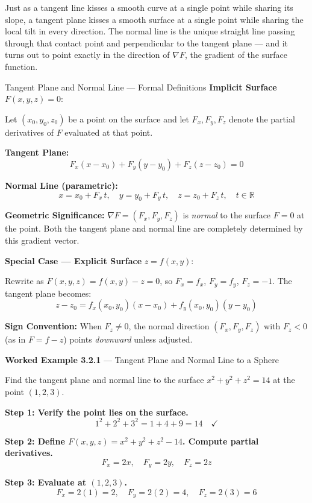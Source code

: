 \documentclass[12pt,a4paper]{article}
\begin{document}
Just as a tangent line kisses a smooth curve at a single point while sharing its slope, a tangent plane kisses a smooth surface at a single point while sharing the local tilt in every direction. The normal line is the unique straight line passing through that contact point and perpendicular to the tangent plane --- and it turns out to point exactly in the direction of $\nabla F$, the gradient of the surface function.

\begin{infobox}{Tangent Plane and Normal Line --- Formal Definitions}
\textbf{Implicit Surface} $F(x,y,z) = 0$:

Let $(x_0, y_0, z_0)$ be a point on the surface and let $F_x, F_y, F_z$ denote the partial derivatives of $F$ evaluated at that point.

\textbf{Tangent Plane:}
\[
  F_x(x - x_0) + F_y(y - y_0) + F_z(z - z_0) = 0
\]

\textbf{Normal Line (parametric):}
\[
  x = x_0 + F_x\, t, \quad y = y_0 + F_y\, t, \quad z = z_0 + F_z\, t, \quad t \in \mathbb{R}
\]

\textbf{Geometric Significance:} $\nabla F = (F_x, F_y, F_z)$ is \emph{normal} to the surface $F = 0$ at the point. Both the tangent plane and normal line are completely determined by this gradient vector.

\textbf{Special Case --- Explicit Surface} $z = f(x,y)$:

Rewrite as $F(x,y,z) = f(x,y) - z = 0$, so $F_x = f_x$, $F_y = f_y$, $F_z = -1$. The tangent plane becomes:
\[
  z - z_0 = f_x(x_0,y_0)(x - x_0) + f_y(x_0,y_0)(y - y_0)
\]

\textbf{Sign Convention:} When $F_z \neq 0$, the normal direction $(F_x, F_y, F_z)$ with $F_z < 0$ (as in $F = f-z$) points \emph{downward} unless adjusted.
\end{infobox}

\vspace{8pt}
\textbf{Worked Example 3.2.1} --- Tangent Plane and Normal Line to a Sphere

Find the tangent plane and normal line to the surface $x^2 + y^2 + z^2 = 14$ at the point $(1, 2, 3)$.

\textbf{Step 1: Verify the point lies on the surface.}
\[
  1^2 + 2^2 + 3^2 = 1 + 4 + 9 = 14 \quad \checkmark
\]

\textbf{Step 2: Define $F(x,y,z) = x^2 + y^2 + z^2 - 14$. Compute partial derivatives.}
\[
  F_x = 2x, \quad F_y = 2y, \quad F_z = 2z
\]

\textbf{Step 3: Evaluate at $(1, 2, 3)$.}
\[
  F_x = 2(1) = 2, \quad F_y = 2(2) = 4, \quad F_z = 2(3) = 6
\]
\end{document}

